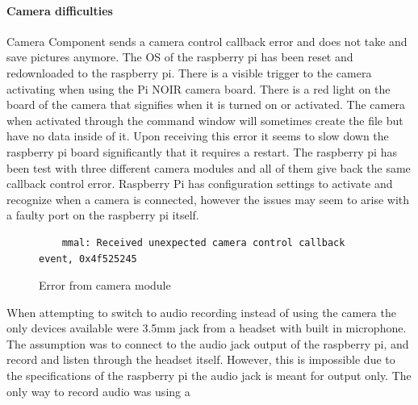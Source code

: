 \paragraph{Camera difficulties} Camera Component sends a camera control callback error and does not take and save pictures anymore. The OS of the raspberry pi has been reset and redownloaded to the raspberry pi. There is a visible trigger to the camera activating when using the Pi NOIR camera board. There is a red light on the board of the camera that signifies when it is turned on or activated. The camera when activated through the command window will sometimes create the file but have no data inside of it. Upon receiving this error it seems to slow down the raspberry pi board significantly that it requires a restart. The raspberry pi has been test with three different camera modules and all of them give back the same callback control error.  Raspberry Pi has configuration settings to activate and recognize when a camera is connected, however the issues may seem to arise with a faulty port on the raspberry pi itself.
\begin{figure}[h]
	\begin{lstlisting}
	mmal: Received unexpected camera control callback event, 0x4f525245
	\end{lstlisting}
	\label{fig:camErr}
	\caption{Error from camera module}
\end{figure}
\par When attempting to switch to audio recording instead of using the camera the only devices available were 3.5mm jack from a headset with built in microphone. The assumption was to connect to the audio jack output of the raspberry pi, and record and listen through the headset itself. However, this is impossible due to the specifications of the raspberry pi the audio jack is meant for output only. The only way to record audio was using a 